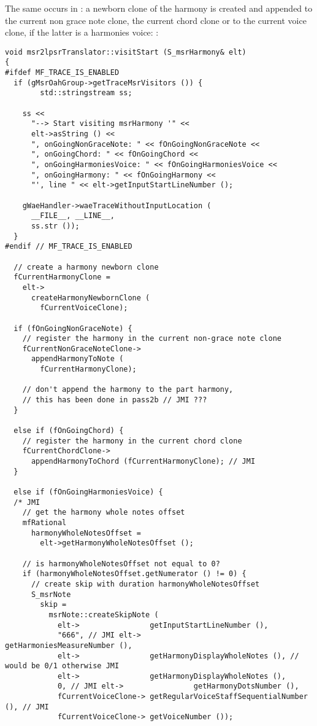 The same occurs in : a newborn clone of the harmony is created and appended to the current non grace note clone, the current chord clone or to the current voice clone, if the latter is a harmonies voice: %
:
\begin{lstlisting}[language=CPlusPlus]
void msr2lpsrTranslator::visitStart (S_msrHarmony& elt)
{
#ifdef MF_TRACE_IS_ENABLED
  if (gMsrOahGroup->getTraceMsrVisitors ()) {
		std::stringstream ss;

    ss <<
      "--> Start visiting msrHarmony '" <<
      elt->asString () <<
      ", onGoingNonGraceNote: " << fOnGoingNonGraceNote <<
      ", onGoingChord: " << fOnGoingChord <<
      ", onGoingHarmoniesVoice: " << fOnGoingHarmoniesVoice <<
      ", onGoingHarmony: " << fOnGoingHarmony <<
      "', line " << elt->getInputStartLineNumber ();

    gWaeHandler->waeTraceWithoutInputLocation (
      __FILE__, __LINE__,
      ss.str ());
  }
#endif // MF_TRACE_IS_ENABLED

  // create a harmony newborn clone
  fCurrentHarmonyClone =
    elt->
      createHarmonyNewbornClone (
        fCurrentVoiceClone);

  if (fOnGoingNonGraceNote) {
    // register the harmony in the current non-grace note clone
    fCurrentNonGraceNoteClone->
      appendHarmonyToNote (
        fCurrentHarmonyClone);

    // don't append the harmony to the part harmony,
    // this has been done in pass2b // JMI ???
  }

  else if (fOnGoingChord) {
    // register the harmony in the current chord clone
    fCurrentChordClone->
      appendHarmonyToChord (fCurrentHarmonyClone); // JMI
  }

  else if (fOnGoingHarmoniesVoice) {
  /* JMI
    // get the harmony whole notes offset
    mfRational
      harmonyWholeNotesOffset =
        elt->getHarmonyWholeNotesOffset ();

    // is harmonyWholeNotesOffset not equal to 0?
    if (harmonyWholeNotesOffset.getNumerator () != 0) {
      // create skip with duration harmonyWholeNotesOffset
      S_msrNote
        skip =
          msrNote::createSkipNote (
            elt->                getInputStartLineNumber (),
            "666", // JMI elt->                getHarmoniesMeasureNumber (),
            elt->                getHarmonyDisplayWholeNotes (), // would be 0/1 otherwise JMI
            elt->                getHarmonyDisplayWholeNotes (),
            0, // JMI elt->                getHarmonyDotsNumber (),
            fCurrentVoiceClone-> getRegularVoiceStaffSequentialNumber (), // JMI
            fCurrentVoiceClone-> getVoiceNumber ());


\end{lstlisting}
